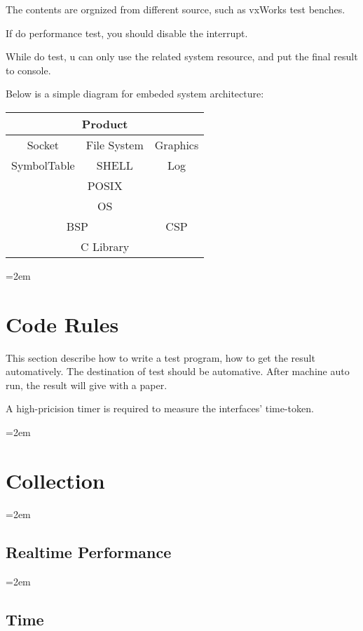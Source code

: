 \documentclass[a4paper]{article}
\let\oldsection\section
\renewcommand{\section}{\leftskip=2em \oldsection}
\let\oldsubsection\subsection
\renewcommand{\subsection}{\leftskip=2em \oldsubsection}
\begin{document}
The contents are orgnized from different source, such as vxWorks test benches.

If do performance test, you should disable the interrupt.

While do test, u can only use the related system resource, and put the final result to console.

Below is a simple diagram for embeded system architecture:\\

\begin{tabular}{|c|c|c|}
\hline \multicolumn{3}{|c|}{Product}\\
\hline Socket & File System & Graphics\\
\hline SymbolTable & SHELL & Log\\
\hline\multicolumn{3}{|c|}{POSIX}\\
\hline\multicolumn{3}{|c|}{OS}\\
\hline\multicolumn{2}{|c|}{BSP} & CSP\\
\hline\multicolumn{3}{|c|}{C Library}\\
\hline
\end{tabular}

\newpage
\section{Code Rules}

This section describe how to write a test program, how to get the result automatively. The destination of test should be automative. After machine auto run, the result will give with a paper.

A high-pricision timer is required to measure the interfaces' time-token.

\newpage
\section{Collection}

\subsection{Realtime Performance}
\subsection{Time}
\end{document}
